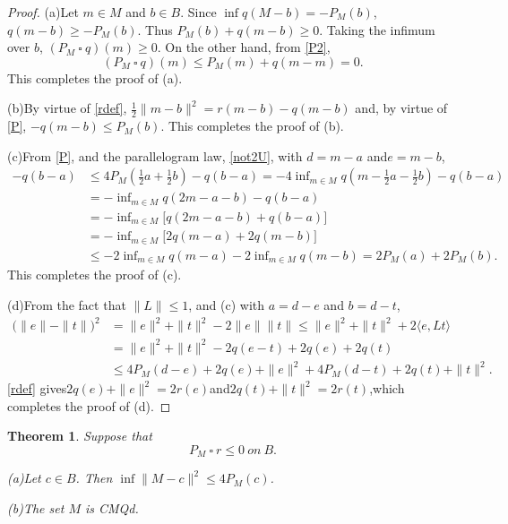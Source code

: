 \documentclass[letterpaper]{article}
\theoremstyle{plain}
\newtheorem{theorem}{Theorem}[section]
\theoremstyle{definition}
\numberwithin{equation}{section}
\newcommand{\bra}[2]{\langle#1,#2\rangle}
\newcommand{\cmqd}{{CMQd}}
\newcommand{\half}{{\textstyle\frac{1}{2}}}
\newcommand{\infn}{\inf\nolimits}
\newcommand{\ssquare}{\ \square\ }
\newcommand{\Thm}{Theorem~\ref}
\begin{document}
\begin{proof}
(a)\enspace Let $m \in M$ and $b \in B$.   Since $\inf q(M - b) = -P_M(b)$,\break $q(m - b) \ge -P_M(b)$.   Thus $P_M(b) + q(m - b) \ge 0$.   Taking the infimum over $b$, $(P_M \ssquare q)(m) \ge 0$.   On the other hand, from \eqref{P2}, $$(P_M \ssquare q)(m) \le P_M(m) + q(m - m) = 0.$$ 
%
This completes the proof of (a).
\par
(b)\enspace By virtue of \eqref{rdef}, $\half\|m - b\|^2 = r(m - b) -q(m - b)$ and, by virtue of  \eqref{P}, $-q(m - b) \le P_M(b)$.   This completes the proof of (b).
\par
(c)\enspace From \eqref{P}, and the parallelogram law, \eqref{not2U}, with $d = m - a$ and\break $e = m - b$,
%
\begin{align*}
- q(b - a) &\le 4P_M(\half a + \half b) - q(b - a)
= -4\infn_{m \in M}q(m - \half a - \half b) - q(b - a)\\
&= -\infn_{m \in M}q(2m - a - b) - q(b - a)\\
&= -\infn_{m \in M}\big[q(2m - a - b) + q(b - a)\big]\\
&= -\infn_{m \in M}\big[2q(m - a) + 2q(m - b)\big]\\
&\le -2\infn_{m \in M}q(m - a) - 2\infn_{m \in M}q(m - b) = 2P_M(a) + 2P_M(b). 
\end{align*}
This completes the proof of (c).
\par
(d)\enspace From the fact that $\|L\| \le 1$, and  (c) with $a = d - e$ and $b = d - t$, 
\begin{align*}
\big(\|e\| - \|t\|\big)^2 &= \|e\|^2 + \|t\|^2 - 2\|e\|\|t\| \le \|e\|^2 + \|t\|^2 + 2\bra{e}{Lt}\\
&= \|e\|^2 + \|t\|^2 - 2q(e - t) + 2q(e) + 2q(t)\\ 
&\le 4P_M(d -e) + 2q(e) + \|e\|^2 + 4P_M(d -t) + 2q(t) + \|t\|^2.
\end{align*}
%
\eqref{rdef} gives\quad $2q(e) + \|e\|^2 = 2r(e)$\quad and\quad $2q(t) + \|t\|^2 = 2r(t)$,\quad which completes the proof of (d).
\end{proof}
\begin{theorem}\label{SUFFthm}
Suppose that
\begin{equation}\label{SUFF1}
P_M \ssquare r \le 0\ on\ B.
\end{equation}  
\par
\noindent
{\rm(a)}\enspace Let $c \in B$. Then $\inf\|M - c\|^2 \le 4P_M(c)$.  
\par
\noindent
{\rm(b)}\enspace The set $M$ is \cmqd.
\end{theorem}
\end{document}
